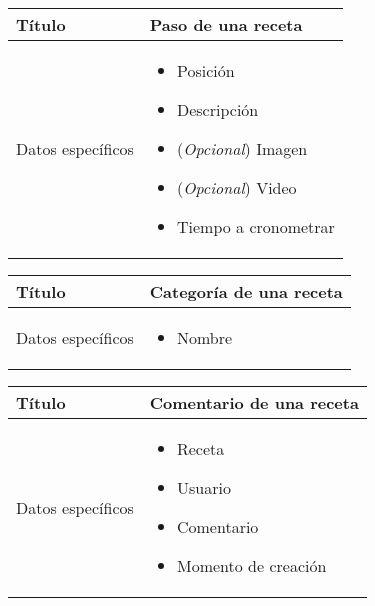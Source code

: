 \begin{center}  
  \begin{tabularx}{\textwidth}{|l|X|}
    \hline

    Título & Paso de una receta\\

    \hline
    Datos específicos &

    \begin{itemize}
    \item Posición
    \item Descripción
    \item (\textit{Opcional}) Imagen
    \item (\textit{Opcional}) Video
    \item Tiempo a cronometrar
    \end{itemize}
    \\
    
    \hline
    
  \end{tabularx}
\end{center}


\begin{center}  
  \begin{tabularx}{\textwidth}{|l|X|}
    \hline

    Título & Categoría de una receta\\

    \hline
    Datos específicos &

    \begin{itemize}
    \item Nombre
    \end{itemize}
    \\
    
    \hline
    
  \end{tabularx}
\end{center}


\begin{center}  
  \begin{tabularx}{\textwidth}{|l|X|}
    \hline

    Título & Comentario de una receta\\

    \hline
    Datos específicos &

    \begin{itemize}
    \item Receta
    \item Usuario
    \item Comentario
    \item Momento de creación
    \end{itemize}
    \\
    
    \hline
    
  \end{tabularx}
\end{center}


